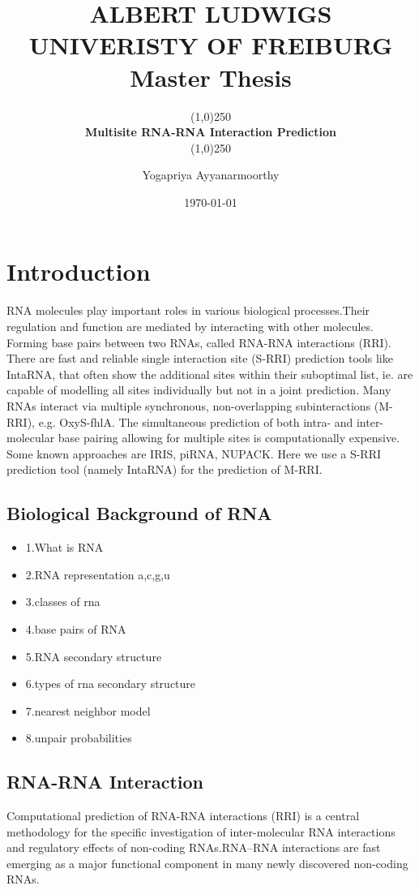 \documentclass[twoside,a4paper]{report}
\title{ALBERT LUDWIGS UNIVERISTY OF FREIBURG
		\\{\Large Master Thesis}}
\subtitle{\line(1,0){250}\\{\textbf{\Huge Multisite RNA-RNA Interaction Prediction}}\\\line(1,0){250}}
\author{Yogapriya Ayyanarmoorthy}
\date{\today}
\begin{document}
	
	\maketitle
	
	\tableofcontents
	
	\chapter{Introduction}
	RNA molecules play important roles in various biological processes.Their regulation and function are mediated by interacting with other molecules. 	Forming base pairs between two RNAs, called RNA-RNA interactions (RRI). There are fast and reliable single interaction site (S-RRI) prediction tools like IntaRNA, that often show the additional sites within their suboptimal list, ie. are capable of modelling all sites individually but not in a joint prediction. Many RNAs interact via multiple synchronous, non-overlapping subinteractions (M-RRI), e.g. OxyS-fhlA. The simultaneous prediction of both intra- and inter-molecular base pairing allowing for multiple sites is computationally expensive. Some known approaches are IRIS, piRNA, NUPACK. Here we use a S-RRI prediction tool (namely IntaRNA) for the prediction of M-RRI.
	
	\section{Biological Background of RNA}
	\begin{itemize}
	 	\item 1.What is RNA
	 	\item 2.RNA representation {a,c,g,u}
	 	\item 3.classes of rna
	 	\item 4.base pairs of RNA
	 	\item 5.RNA secondary structure
	 	\item 6.types of rna secondary structure
	 	\item 7.nearest neighbor model
	 	\item 8.unpair probabilities 
	\end{itemize}
	
	\section{RNA-RNA Interaction}
 	Computational prediction of RNA-RNA interactions (RRI) is a central methodology for the specific investigation of inter-molecular RNA interactions and regulatory effects of non-coding RNAs.RNA–RNA interactions are fast emerging as a major functional component in many newly discovered non-coding RNAs.\\
 	
\end{document}
